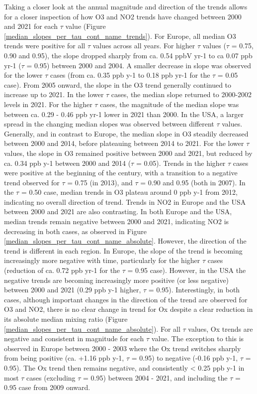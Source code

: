 \documentclass[journal abbreviation, manuscript]{copernicus}
\begin{document}
Taking a closer look at the annual magnitude and direction of the trends allows for a closer inspection of how O3 and NO2 trends have changed between 2000 and 2021 for each $\tau$ value (Figure \ref{median_slopes_per_tau_cont_name_trends}). For Europe, all median O3 trends were positive for all $\tau$ values across all years. For higher $\tau$ values ($\tau$ = 0.75, 0.90 and 0.95), the slope dropped sharply from ca. 0.54 ppbV yr-1 to ca 0.07 ppb yr-1 ($\tau$ = 0.95) between 2000 and 2004. A smaller decrease in slope was observed for the lower $\tau$ cases (from ca. 0.35 ppb y-1 to 0.18 ppb yr-1 for the $\tau$ = 0.05 case). From 2005 onward, the slope in the O3 trend generally continued to increase up to 2021. In the lower $\tau$ cases, the median slope returned to 2000-2002 levels in 2021. For the higher $\tau$ cases, the magnitude of the median slope was between ca. 0.29 - 0.46 ppb yr-1 lower in 2021 than 2000. In the USA, a larger spread in the changing median slopes was observed between different $\tau$ values. Generally, and in contrast to Europe, the median slope in O3 steadily decreased between 2000 and 2014, before plateauing between 2014 to 2021. For the lower $\tau$ values, the slope in O3 remained positive between 2000 and 2021, but reduced by ca. 0.34 ppb y-1 between 2000 and 2014 ($\tau$ = 0.05). Trends in the higher $\tau$ cases were positive at the beginning of the century, with a transition to a negative trend observed for $\tau$ = 0.75 (in 2013), and $\tau$ = 0.90 and 0.95 (both in 2007). In the $\tau$ = 0.50 case, median trends in O3 plateau around 0 ppb y-1 from 2012, indicating no overall direction of trend. Trends in NO2 in Europe and the USA between 2000 and 2021 are also contrasting. In both Europe and the USA, median trends remain negative between 2000 and 2021, indicating NO2 is decreasing in both cases, as observed in Figure \ref{median_slopes_per_tau_cont_name_absolute}. However, the direction of the trend is different in each region. In Europe, the slope of the trend is becoming increasingly more negative with time, particularly for the higher $\tau$ cases (reduction of ca. 0.72 ppb yr-1 for the $\tau$ = 0.95 case). However, in the USA the negative trends are becoming increasingly more positive (or less negative) between 2000 and 2021 (0.29 ppb y-1 higher, $\tau$ = 0.95). Interestingly, in both cases, although important changes in the direction of the trend are observed for O3 and NO2, there is no clear change in trend for Ox despite a clear reduction in its absolute median mixing ratio (Figure \ref{median_slopes_per_tau_cont_name_absolute}). For all $\tau$ values, Ox trends are negative and consistent in magnitude for each $\tau$ value. The exception to this is observed in Europe between 2000 - 2003 where the Ox trend switches sharply from being positive (ca. +1.16 ppb y-1, $\tau$ = 0.95) to negative (-0.16 ppb y-1, $\tau$ = 0.95). The Ox trend then remains negative, and consistently < 0.25 ppb y-1 in most $\tau$ cases (excluding $\tau$ = 0.95) between 2004 - 2021, and including the $\tau$ = 0.95 case from 2009 onward.
\end{document}
